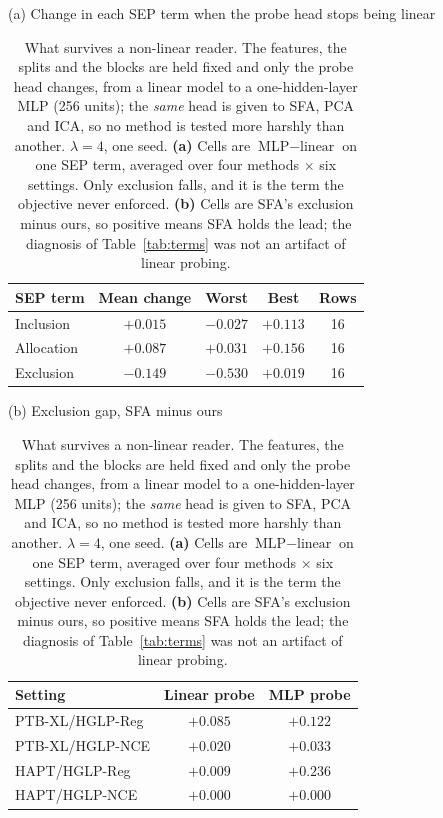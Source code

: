 \begin{table}[H]
\caption{What survives a non-linear reader. The features, the splits and the blocks are
held fixed and only the probe head changes, from a linear model to a one-hidden-layer
MLP (256 units); the \emph{same} head is given to SFA, PCA and ICA, so no method is
tested more harshly than another. $\lambda=4$, one seed. \textbf{(a)} Cells are
$\text{MLP}-\text{linear}$ on one SEP term, averaged over four methods $\times$ six
settings. Only exclusion falls, and it is the term the objective never enforced.
\textbf{(b)} Cells are SFA's exclusion minus ours, so positive means SFA holds the
lead; the diagnosis of Table~\ref{tab:terms} was not an artifact of linear probing.}
\label{tab:mlpprobe}
\centering
\small
(a) Change in each SEP term when the probe head stops being linear\\[2pt]
\begin{tabular}{lcccc}
\hline
SEP term & Mean change & Worst & Best & Rows \\
\hline
Inclusion & $+0.015$ & $-0.027$ & $+0.113$ & 16 \\
Allocation & $+0.087$ & $+0.031$ & $+0.156$ & 16 \\
Exclusion & $-0.149$ & $-0.530$ & $+0.019$ & 16 \\
\hline
\end{tabular}

\medskip
(b) Exclusion gap, SFA minus ours\\[2pt]
\begin{tabular}{lcc}
\hline
Setting & Linear probe & MLP probe \\
\hline
PTB-XL/HGLP-Reg & $+0.085$ & $+0.122$ \\
PTB-XL/HGLP-NCE & $+0.020$ & $+0.033$ \\
HAPT/HGLP-Reg & $+0.009$ & $+0.236$ \\
HAPT/HGLP-NCE & $+0.000$ & $+0.000$ \\
\hline
\end{tabular}
\end{table}
